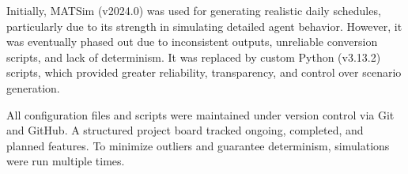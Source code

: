 Initially, MATSim (v2024.0) was used for generating realistic daily schedules, particularly due to its strength in simulating detailed agent behavior. However, it was eventually phased out due to inconsistent outputs, unreliable conversion scripts, and lack of determinism. It was replaced by custom Python (v3.13.2) scripts, which provided greater reliability, transparency, and control over scenario generation.

All configuration files and scripts were maintained under version control via Git and GitHub. A structured project board tracked ongoing, completed, and planned features. To minimize outliers and guarantee determinism, simulations were run multiple times.
